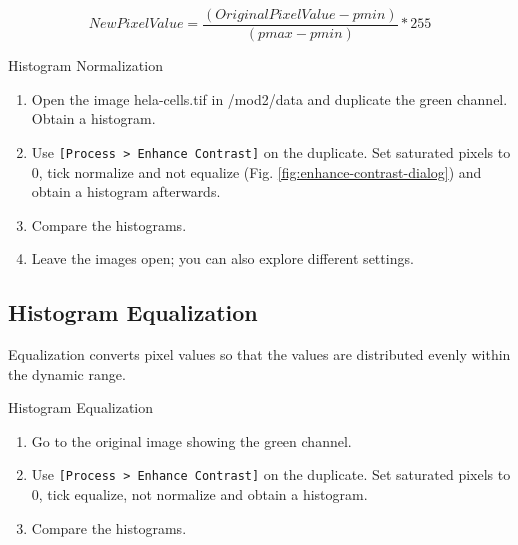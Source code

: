 \begin{equation*}
\mathit{NewPixelValue}=\frac{(\mathit{OriginalPixelValue}-\mathit{pmin})}{(\mathit{pmax}-\mathit{pmin})}\ast
255
\end{equation*}

\begin{taskbox}{Histogram Normalization}

\begin{enumerate}
	\item Open the image hela-cells.tif in /mod2/data and duplicate the green channel. Obtain a histogram.
	\item Use \texttt{[Process > Enhance Contrast]} on the duplicate. Set saturated pixels to 0, tick normalize and not equalize (Fig. \ref{fig:enhance-contrast-dialog}) and obtain a histogram afterwards.
	
	\begin{minipage}[t]{\linewidth}
		\begin{center}
		\medskip
		\label{fig:enhance-contrast-dialog}
		\end{center}
	\end{minipage}
	
	\item Compare the histograms. 
	\item Leave the images open; you can also explore different settings.
	
	\end{enumerate}
\end{taskbox}

\subsection{Histogram Equalization}
Equalization converts pixel values so that the values are distributed evenly within the dynamic range. 

\begin{taskbox}{Histogram Equalization}

\begin{enumerate}
	\item Go to the original image showing the green channel.
	\item Use \texttt{[Process > Enhance Contrast]} on the duplicate. Set saturated pixels to 0, tick equalize, not normalize and obtain a histogram.
	\item Compare the histograms. 
	
	\end{enumerate}
\end{taskbox}

